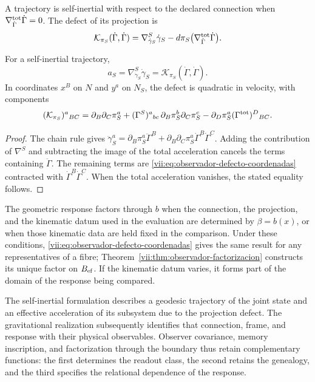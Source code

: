 \begin{definition}
\label{vii:def:observador-autoinercia}
A trajectory is self-inertial with respect to the declared connection
when \(\nabla^{\rm tot}_{\dot\Gamma}\dot\Gamma=0\).
The defect of its projection is
\begin{equation}
 \mathcal K_{\pi_S}(\dot\Gamma,\dot\Gamma)
 =\nabla^S_{\dot\gamma_S}\dot\gamma_S
  -d\pi_S\bigl(\nabla^{\rm tot}_{\dot\Gamma}\dot\Gamma\bigr).
 \label{vii:eq:observador-defecto-proyeccion}
\end{equation}
\end{definition}

\begin{proposition}
\label{vii:prop:observador-aceleracion}
For a self-inertial trajectory,
\[
 a_S=\nabla^S_{\dot\gamma_S}\dot\gamma_S
     =\mathcal K_{\pi_S}(\dot\Gamma,\dot\Gamma).
\]
In coordinates \(x^B\) on \(N\) and \(y^a\) on \(N_S\), the
defect is quadratic in velocity, with components
\begin{equation}
 (\mathcal K_{\pi_S})^a{}_{BC}
 =\partial_B\partial_C\pi_S^a
  +(\Gamma^S)^a{}_{bc}\,
        \partial_B\pi_S^b\partial_C\pi_S^c
  -\partial_D\pi_S^a(\Gamma^{\rm tot})^D{}_{BC}.
 \label{vii:eq:observador-defecto-coordenadas}
\end{equation}
\end{proposition}

\begin{proof}
The chain rule gives
\(\ddot\gamma_S^a=\partial_B\pi_S^a\ddot\Gamma^B
 +\partial_B\partial_C\pi_S^a\dot\Gamma^B\dot\Gamma^C\).
Adding the contribution of \(\nabla^S\) and subtracting the image of
the total acceleration cancels the terms containing \(\ddot\Gamma\).
The remaining terms are
\eqref{vii:eq:observador-defecto-coordenadas} contracted with
\(\dot\Gamma^B\dot\Gamma^C\). When the total acceleration vanishes,
the stated equality follows.
\end{proof}

The geometric response factors through \(b\) when the connection,
the projection, and the kinematic datum used in the evaluation are
determined by \(\beta=b(x)\), or when those kinematic data are
held fixed in the comparison. Under these conditions,
\eqref{vii:eq:observador-defecto-coordenadas} gives the same result
for any representatives of a fibre;
Theorem~\ref{vii:thm:observador-factorizacion} constructs its unique
factor on \(B_{\rm ef}\). If the kinematic datum varies, it
forms part of the domain of the response being compared.

The self-inertial formulation describes a geodesic trajectory of the
joint state and an effective acceleration of its subsystem due
to the projection defect. The gravitational realization subsequently identifies
that connection, frame, and response with their physical
observables. Observer covariance, memory inscription, and
factorization through the boundary thus retain complementary functions:
the first determines the readout class, the second retains the
genealogy, and the third specifies the relational dependence of the
response.
